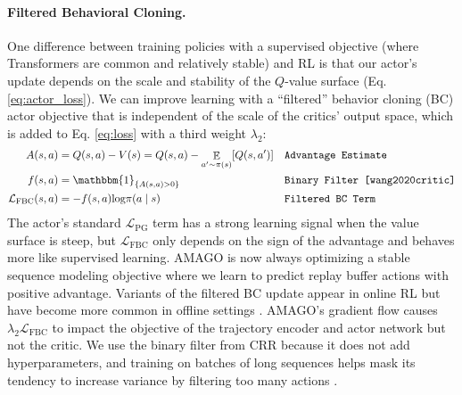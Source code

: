 \documentclass{article}
\begin{document}
\paragraph{Filtered Behavioral Cloning.} One difference between training policies with a supervised objective (where Transformers are common and relatively stable) and RL is that our actor's update depends on the scale and stability of the $Q$-value surface (Eq. \ref{eq:actor_loss}). We can improve learning with a ``filtered'' behavior cloning (BC) actor objective that is independent of the scale of the critics' output space, which is added to Eq. \ref{eq:loss} with a third weight $\lambda_2$:
\begin{align}
    A(s, a) &= Q(s, a) - V(s) = Q(s, a) - \mathop{\mathbb{E}}_{a' \sim \pi(s)}[Q(s, a')] && \text{\texttt{Advantage Estimate}} \\
    f(s, a) &= \mathbbm{1}_{\{A(s, a) > 0\}} && \text{\texttt{Binary Filter \cite{wang2020critic}}} \\
    \label{eq:fbc}
    \mathcal{L}_{\text{FBC}}(s, a) &= -f(s, a)\text{log}\pi(a \mid s) && \text{\texttt{Filtered BC Term}}
\end{align}
The actor's standard $\mathcal{L}_{\text{PG}}$ term has a strong learning signal when the value surface is steep, but $\mathcal{L}_{\text{FBC}}$ only depends on the sign of the advantage and behaves more like supervised learning. AMAGO is now always optimizing a stable sequence modeling objective where we learn to predict replay buffer actions with positive advantage. Variants of the filtered BC update appear in online RL but have become more common in offline settings \cite{levine2020offline, nair2020awac}. AMAGO's gradient flow causes $\lambda_2 \mathcal{L}_{\text{FBC}}$ to impact the objective of the trajectory encoder and actor network but not the critic. We use the binary filter from CRR \cite{wang2020critic} because it does not add hyperparameters, and training on batches of long sequences helps mask its tendency to increase variance by filtering too many actions \cite{grigsby2021closer}.
\end{document}

